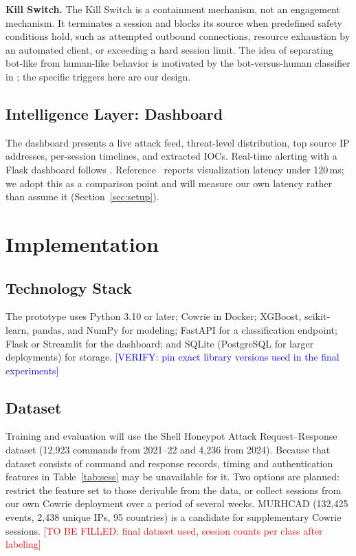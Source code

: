 \documentclass[conference]{IEEEtran}
\newcommand{\tbf}[1]{\textcolor{red}{[TO BE FILLED: #1]}}
\newcommand{\ver}[1]{\textcolor{blue}{[VERIFY: #1]}}
\begin{document}
\textbf{Kill Switch.} The Kill Switch is a containment mechanism, not an engagement mechanism. It terminates a session and blocks its source when predefined safety conditions hold, such as attempted outbound connections, resource exhaustion by an automated client, or exceeding a hard session limit. The idea of separating bot-like from human-like behavior is motivated by the bot-versus-human classifier in \cite{ref6}; the specific triggers here are our design.

\subsection{Intelligence Layer: Dashboard}
The dashboard presents a live attack feed, threat-level distribution, top source IP addresses, per-session timelines, and extracted IOCs. Real-time alerting with a Flask dashboard follows \cite{ref5}. Reference~\cite{ref6} reports visualization latency under 120\,ms; we adopt this as a comparison point and will measure our own latency rather than assume it (Section~\ref{sec:setup}).

\section{Implementation}\label{sec:impl}
\subsection{Technology Stack}
The prototype uses Python 3.10 or later; Cowrie in Docker; XGBoost, scikit-learn, pandas, and NumPy for modeling; FastAPI for a classification endpoint; Flask or Streamlit for the dashboard; and SQLite (PostgreSQL for larger deployments) for storage. \ver{pin exact library versions used in the final experiments}

\subsection{Dataset}\label{sec:dataset}
Training and evaluation will use the Shell Honeypot Attack Request--Response dataset \cite{ref10} (12,923 commands from 2021--22 and 4,236 from 2024). Because that dataset consists of command and response records, timing and authentication features in Table~\ref{tab:sess} may be unavailable for it. Two options are planned: restrict the feature set to those derivable from the data, or collect sessions from our own Cowrie deployment over a period of several weeks. MURHCAD \cite{ref11} (132,425 events, 2,438 unique IPs, 95 countries) is a candidate for supplementary Cowrie sessions. \tbf{final dataset used, session counts per class after labeling}
\end{document}
